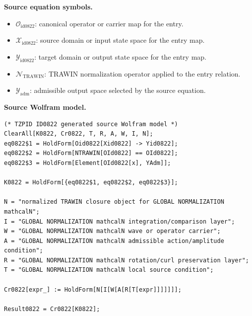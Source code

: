 \begin{minipage}[t]{0.49\linewidth}
\begingroup
\small
\raggedright
\textbf{Source equation symbols.}\par
\begin{itemize}[leftmargin=1.35em,itemsep=1pt,topsep=1pt,parsep=0pt]
    \item $\mathcal{O}_{\mathrm{id0822}}$: canonical operator or carrier map for the entry.
    \item $\mathcal{X}_{\mathrm{id0822}}$: source domain or input state space for the entry map.
    \item $\mathcal{Y}_{\mathrm{id0822}}$: target domain or output state space for the entry map.
    \item $\mathcal{N}_{\mathrm{TRAWIN}}$: TRAWIN normalization operator applied to the entry relation.
    \item $\mathcal{Y}_{\mathrm{adm}}$: admissible output space selected by the source equation.
\end{itemize}
\endgroup
\end{minipage}\hfill
\begin{minipage}[t]{0.47\linewidth}
\begingroup
\scriptsize
\raggedright
\textbf{Source Wolfram model.}\par
\begin{Verbatim}[fontsize=\tiny,breaklines=true,breakanywhere=true]
(* TZPID ID0822 generated source Wolfram model *)
ClearAll[K0822, Cr0822, T, R, A, W, I, N];
eq0822$1 = HoldForm[Oid0822[Xid0822] -> Yid0822];
eq0822$2 = HoldForm[NTRAWIN[OId0822] == OId0822];
eq0822$3 = HoldForm[Element[OId0822[x], YAdm]];

K0822 = HoldForm[{eq0822$1, eq0822$2, eq0822$3}];

N = "normalized TRAWIN closure object for GLOBAL NORMALIZATION mathcalN";
I = "GLOBAL NORMALIZATION mathcalN integration/comparison layer";
W = "GLOBAL NORMALIZATION mathcalN wave or operator carrier";
A = "GLOBAL NORMALIZATION mathcalN admissible action/amplitude condition";
R = "GLOBAL NORMALIZATION mathcalN rotation/curl preservation layer";
T = "GLOBAL NORMALIZATION mathcalN local source condition";

Cr0822[expr_] := HoldForm[N[I[W[A[R[T[expr]]]]]]];

Result0822 = Cr0822[K0822];
\end{Verbatim}
\endgroup
\end{minipage}

